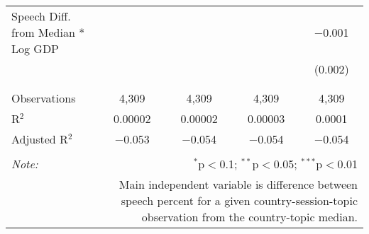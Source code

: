 \begin{table}[!htbp]
\begin{tabular}{@{\extracolsep{5pt}}lcccc}
 Speech Diff. from Median * Log GDP &  &  &  & $-$0.001 \\ 
  &  &  &  & (0.002) \\ 
  & & & & \\ 
\hline \\[-1.8ex] 
Observations & 4,309 & 4,309 & 4,309 & 4,309 \\ 
R$^{2}$ & 0.00002 & 0.00002 & 0.00003 & 0.0001 \\ 
Adjusted R$^{2}$ & $-$0.053 & $-$0.054 & $-$0.054 & $-$0.054 \\ 
\hline 
\hline \\[-1.8ex] 
\textit{Note:}  & \multicolumn{4}{r}{$^{*}$p$<$0.1; $^{**}$p$<$0.05; $^{***}$p$<$0.01} \\ 
 & \multicolumn{4}{r}{Main independent variable is difference between speech percent for a given country-session-topic observation from the country-topic median.} \\ 
\end{tabular} 
\end{table} 

